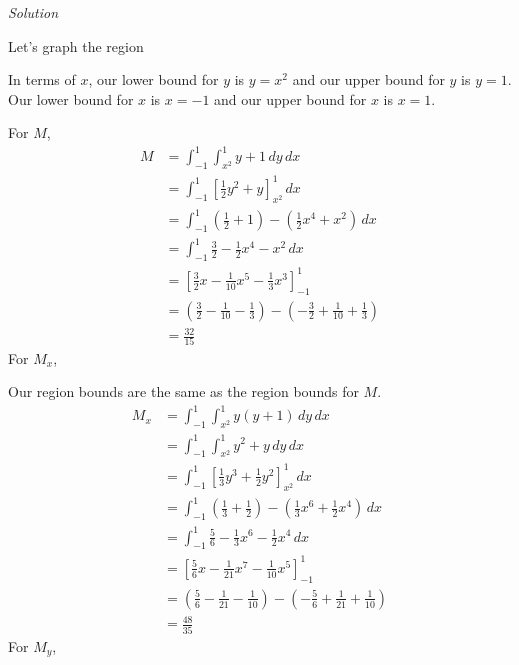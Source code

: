 \documentclass{article}
\newcommand{\lrp}[1]{\left( #1 \right)}
\newcommand{\lrb}[1]{\left[ #1 \right]}
\newcommand{\Solution}{\textit{Solution}}
\begin{document}
\Solution

Let's graph the region
\begin{center}
\end{center}
In terms of $x$, our lower bound for $y$ is $y=x^2$ and our upper bound for $y$ is $y=1$. Our lower bound for 
$x$ is $x=-1$ and our upper bound for $x$ is $x=1$.

For $M$,
\begin{align*}
    M&=\int_{-1}^1\int_{x^2}^1 y+1\,dy\,dx\\
    &=\int_{-1}^1\lrb{\frac{1}{2}y^2+y}_{x^2}^1\,dx\\
    &=\int_{-1}^1 \lrp{\frac{1}{2}+1}-\lrp{\frac{1}{2}x^4+x^2}\,dx\\
    &=\int_{-1}^1 \frac{3}{2}-\frac{1}{2}x^4-x^2\,dx\\
    &=\lrb{\frac{3}{2}x-\frac{1}{10}x^5-\frac{1}{3}x^3}_{-1}^1\\
    &=\lrp{\frac{3}{2}-\frac{1}{10}-\frac{1}{3}}-\lrp{-\frac{3}{2}+\frac{1}{10}+\frac{1}{3}}\\
    &=\frac{32}{15}\tag{use a calculator for this :)}
\end{align*}
For $M_x$,

Our region bounds are the same as the region bounds for $M$.
\begin{align*}
    M_x&=\int_{-1}^1\int_{x^2}^1 y(y+1)\,dy\,dx\\
    &=\int_{-1}^1\int_{x^2}^1 y^2+y\,dy\,dx\\
    &=\int_{-1}^1\lrb{\frac{1}{3}y^3+\frac{1}{2}y^2}_{x^2}^1\,dx\\
    &=\int_{-1}^1 \lrp{\frac{1}{3}+\frac{1}{2}}-\lrp{\frac{1}{3}x^6+\frac{1}{2}x^4}\,dx\\
    &=\int_{-1}^1 \frac{5}{6}-\frac{1}{3}x^6-\frac{1}{2}x^4\,dx\\
    &=\lrb{\frac{5}{6}x-\frac{1}{21}x^7-\frac{1}{10}x^5}_{-1}^1\\
    &=\lrp{\frac{5}{6}-\frac{1}{21}-\frac{1}{10}}-\lrp{-\frac{5}{6}+\frac{1}{21}+\frac{1}{10}}\\
    &=\frac{48}{35}\tag{use a calculator for this :)}
\end{align*}
For $M_y$,
\end{document}
